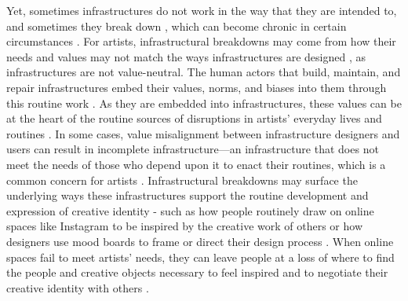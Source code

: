     Yet, sometimes infrastructures do not work in the way that they are intended to, and sometimes they break down \cite{star1996steps}, which can become chronic in certain circumstances \cite{Semaan2019}. For artists, infrastructural breakdowns may come from how their needs and values may not match the ways infrastructures are designed \cite{simpson2023captions, simpson2023rethinking}, as infrastructures are not value-neutral. The human actors that build, maintain, and repair infrastructures embed their values, norms, and biases into them through this routine work \cite{bowker1994information, bowker2000sorting, JacksonValuesInrepair}. As they are embedded into infrastructures, these values can be at the heart of the routine sources of disruptions in artists' everyday lives and routines \cite{Semaan2019}. In some cases, value misalignment between infrastructure designers and users can result in incomplete infrastructure---an infrastructure that does not meet the needs of those who depend upon it to enact their routines, which is a common concern for artists \cite{simpson2023captions}. Infrastructural breakdowns may surface the underlying ways these infrastructures support the routine development and expression of creative identity \cite{gluaveanu2014creativity} - such as how people routinely draw on online spaces like Instagram to be inspired by the creative work of others or how designers use mood boards to frame or direct their design process \cite{lucero2012framing}. When online spaces fail to meet artists’ needs, they can leave people at a loss of where to find the people and creative objects necessary to feel inspired \cite{lucero2012framing} and to negotiate their creative identity with others \cite{hart1998inspiration, gluaveanu2014creativity}.  \par 
    

